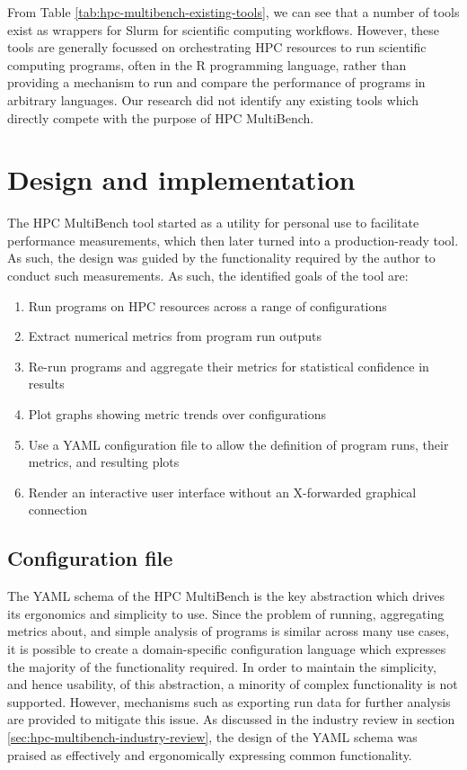 From Table \ref{tab:hpc-multibench-existing-tools}, we can see that a number of tools exist as wrappers for Slurm for scientific computing workflows. However, these tools are generally focussed on orchestrating \acrshort{HPC} resources to run scientific computing programs, often in the R programming language, rather than providing a mechanism to run and compare the performance of programs in arbitrary languages. Our research did not identify any existing tools which directly compete with the purpose of HPC MultiBench.

\section{Design and implementation}
\label{sec:hpc-multibench-design-implementation}

The HPC MultiBench tool started as a utility for personal use to facilitate performance measurements, which then later turned into a production-ready tool. As such, the design was guided by the functionality required by the author to conduct such measurements. As such, the identified goals of the tool are:

\begin{enumerate}
    \item Run programs on \acrshort{HPC} resources across a range of configurations
    \item Extract numerical metrics from program run outputs
    \item Re-run programs and aggregate their metrics for statistical confidence in results
    \item Plot graphs showing metric trends over configurations
    \item Use a YAML configuration file to allow the definition of program runs, their metrics, and resulting plots
    \item Render an interactive user interface without an X-forwarded graphical connection
\end{enumerate}

\subsection{Configuration file}
\label{ssec:hpc-multibench-configuration}

The YAML schema of the HPC MultiBench is the key abstraction which drives its ergonomics and simplicity to use. Since the problem of running, aggregating metrics about, and simple analysis of programs is similar across many use cases, it is possible to create a domain-specific configuration language which expresses the majority of the functionality required. In order to maintain the simplicity, and hence usability, of this abstraction, a minority of complex functionality is not supported. However, mechanisms such as exporting run data for further analysis are provided to mitigate this issue. As discussed in the industry review in section \ref{sec:hpc-multibench-industry-review}, the design of the YAML schema was praised as effectively and ergonomically expressing common functionality.

